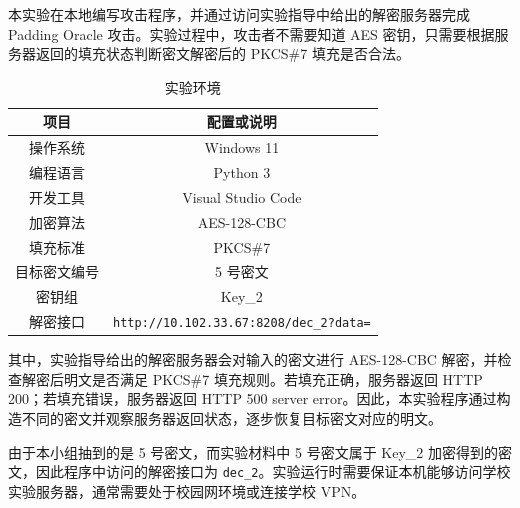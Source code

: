 本实验在本地编写攻击程序，并通过访问实验指导中给出的解密服务器完成 Padding Oracle 攻击。实验过程中，攻击者不需要知道 AES 密钥，只需要根据服务器返回的填充状态判断密文解密后的 PKCS\#7 填充是否合法。

\begin{table}[H]
    \centering
    \caption{实验环境}
    \begin{tabular}{|c|c|}
        \hline
        项目 & 配置或说明 \\
        \hline
        操作系统 & Windows 11 \\
        \hline
        编程语言 & Python 3 \\
        \hline
        开发工具 & Visual Studio Code \\
        \hline
        加密算法 & AES-128-CBC \\
        \hline
        填充标准 & PKCS\#7 \\
        \hline
        目标密文编号 & 5 号密文 \\
        \hline
        密钥组 & Key\_2 \\
        \hline
        解密接口 & \verb|http://10.102.33.67:8208/dec_2?data=| \\
        \hline
    \end{tabular}
\end{table}

其中，实验指导给出的解密服务器会对输入的密文进行 AES-128-CBC 解密，并检查解密后明文是否满足 PKCS\#7 填充规则。若填充正确，服务器返回 HTTP 200；若填充错误，服务器返回 HTTP 500 server error。因此，本实验程序通过构造不同的密文并观察服务器返回状态，逐步恢复目标密文对应的明文。

由于本小组抽到的是 5 号密文，而实验材料中 5 号密文属于 Key\_2 加密得到的密文，因此程序中访问的解密接口为 \verb|dec_2|。实验运行时需要保证本机能够访问学校实验服务器，通常需要处于校园网环境或连接学校 VPN。